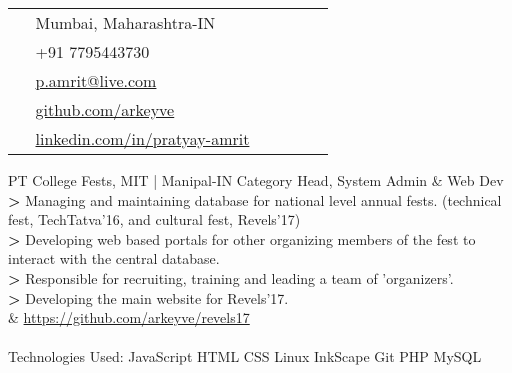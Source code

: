\documentclass[10pt]{article} %
\begin{document}
\begin{paracol}{2}

\switchcolumn %


\parbox[top][0.12\textheight][c]{\linewidth}{ %
	\vspace{-0.04\textheight} %
	\colorbox{shade}{ %
		\begin{supertabular}{p{0.05\linewidth}|p{0.775\linewidth}} %
			\raisebox{-1pt}{\faHome} & Mumbai, Maharashtra-IN \\ %
			\raisebox{-1pt}{\faPhone} & +91 7795443730 \\ %
			\raisebox{0pt}{\small\faEnvelope} & \href{mailto:p.amrit@live.com}{p.amrit@live.com} \\ %
			\raisebox{-1pt}{\faGithub} & \href{https://github.com/arkeyve}{github.com/arkeyve} \\ %
			\raisebox{-1pt}{\faLinkedinSquare} & \href{https://www.linkedin.com/in/pratyay-amrit}{linkedin.com/in/pratyay-amrit} \\ %
		\end{supertabular}
	}
}

\medskip
\medskip
\medskip
\medskip

{PT} %
{College Fests, MIT | Manipal-IN} %
{Category Head, System Admin \& Web Dev} %
{
\textbf{>} Managing and maintaining database for national level annual fests. (technical fest, TechTatva’16, and cultural fest, Revels’17)\\
\textbf{>} Developing web based portals for other organizing members of the fest to interact with the central database.\\
\textbf{>} Responsible for recruiting, training and leading a team of 'organizers'.\\
\textbf{>} Developing the main website for Revels’17.\\
\raisebox{-1pt}{\faGithub} & \href{https://github.com/arkeyve/revels17}{https://github.com/arkeyve/revels17}\\
\\
Technologies Used: JavaScript HTML CSS Linux InkScape Git PHP MySQL
} %


\end{paracol}
\end{document}
